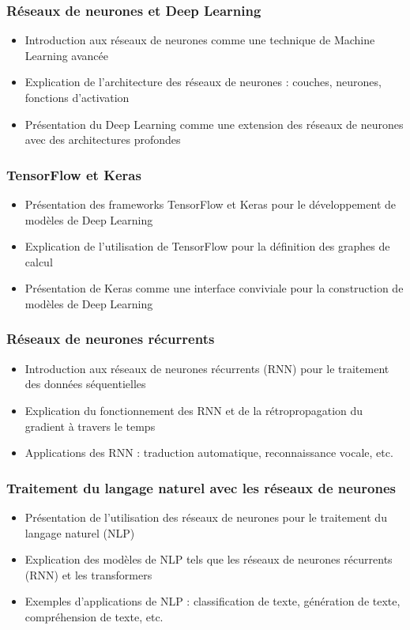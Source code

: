 \documentclass{beamer}
\begin{document}
\begin{frame}
	\frametitle{Réseaux de neurones et Deep Learning}
	\begin{itemize}
		\item Introduction aux réseaux de neurones comme une technique de Machine Learning avancée
		\item Explication de l'architecture des réseaux de neurones : couches, neurones, fonctions d'activation
		\item Présentation du Deep Learning comme une extension des réseaux de neurones avec des architectures profondes
	\end{itemize}
\end{frame}

\begin{frame}
	\frametitle{TensorFlow et Keras}
	\begin{itemize}
		\item Présentation des frameworks TensorFlow et Keras pour le développement de modèles de Deep Learning
		\item Explication de l'utilisation de TensorFlow pour la définition des graphes de calcul
		\item Présentation de Keras comme une interface conviviale pour la construction de modèles de Deep Learning
	\end{itemize}
\end{frame}

\begin{frame}
	\frametitle{Réseaux de neurones récurrents}
	\begin{itemize}
		\item Introduction aux réseaux de neurones récurrents (RNN) pour le traitement des données séquentielles
		\item Explication du fonctionnement des RNN et de la rétropropagation du gradient à travers le temps
		\item Applications des RNN : traduction automatique, reconnaissance vocale, etc.
	\end{itemize}
\end{frame}

\begin{frame}
	\frametitle{Traitement du langage naturel avec les réseaux de neurones}
	\begin{itemize}
		\item Présentation de l'utilisation des réseaux de neurones pour le traitement du langage naturel (NLP)
		\item Explication des modèles de NLP tels que les réseaux de neurones récurrents (RNN) et les transformers
		\item Exemples d'applications de NLP : classification de texte, génération de texte, compréhension de texte, etc.
	\end{itemize}
\end{frame}
\end{document}
